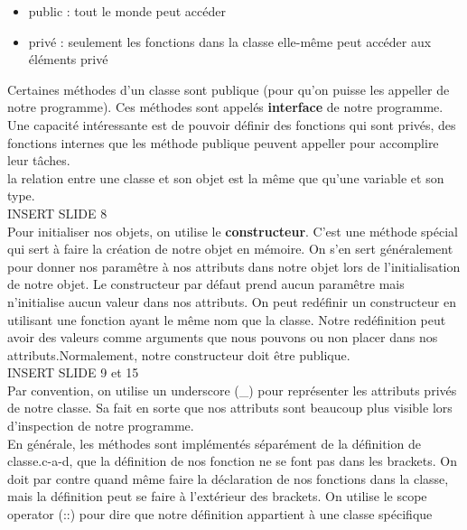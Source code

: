 \documentclass[oneside]{book}
\begin{document}
\begin{itemize}
\item public : tout le monde peut accéder
\item privé : seulement les fonctions dans la classe elle-même peut accéder aux éléments privé
\end{itemize}


Certaines méthodes d'un classe sont publique (pour qu'on puisse les appeller de notre programme). Ces méthodes sont appelés \textbf{interface} de notre programme. Une capacité intéressante est de pouvoir définir des fonctions qui sont privés, des fonctions internes que les méthode publique peuvent appeller pour accomplire leur tâches.\\

la relation entre une classe et son objet est la même que qu'une variable et son type.\\

INSERT SLIDE 8\\

Pour initialiser nos objets, on utilise le \textbf{constructeur}. C'est une méthode spécial qui sert à faire la création de notre objet en mémoire. On s'en sert généralement pour donner nos paramêtre à nos attributs dans notre objet lors de l'initialisation de notre objet. Le constructeur par défaut prend aucun paramêtre mais n'initialise aucun valeur dans nos attributs. On peut redéfinir un constructeur en utilisant une fonction ayant le même nom que la classe. Notre redéfinition peut avoir des valeurs comme arguments que nous pouvons ou non placer dans nos attributs.Normalement, notre constructeur doit être publique.  \\

INSERT SLIDE 9 et 15\\

Par convention, on utilise un underscore (\_) pour représenter les attributs privés de notre classe. Sa fait en sorte que nos attributs sont beaucoup plus visible lors d'inspection de notre programme.\\

En générale, les méthodes sont implémentés séparément de la définition de classe.c-a-d, que la définition de nos fonction ne se font pas dans les brackets. On doit par contre quand même faire la déclaration de nos fonctions dans la classe, mais la définition peut se faire à l'extérieur des brackets. On utilise le scope operator (::) pour dire que notre définition appartient à une classe spécifique\\
\end{document}
